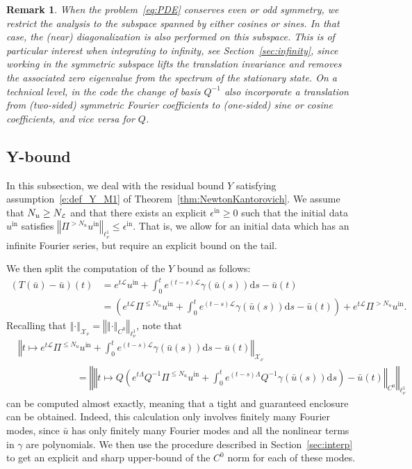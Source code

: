 \documentclass[10pt,a4paper]{article}
\theoremstyle{plain}
\newtheorem{remark}[theorem]{Remark}
\renewcommand{\L}{\mathcal{L}}
\newcommand{\X}{\mathcal{X}}
\newcommand{\bu}{\bar{u}}
\newcommand{\1}{\mathbf{1}}
\newcommand{\uin}{{u^{\mathrm{in}}}}
\newcommand{\Nu}{N_{u}}
\newcommand{\NL}{N_{\text{\tiny{$\L$}}}}
\newcommand{\Nin}{\Nu}
\begin{document}
\begin{remark}\label{rem:symmetry}
When the problem~\eqref{eq:PDE} conserves even or odd symmetry, we restrict the analysis to the subspace spanned by either cosines or sines. In that case, the (near) diagonalization is also performed on this subspace. This is of particular interest when integrating to infinity, see Section~\ref{sec:infinity}, since working in the symmetric subspace lifts the translation invariance and removes the associated zero eigenvalue from the spectrum of the stationary state. On a technical level, in the code the change of basis $Q^{-1}$ also incorporate a translation from (two-sided) symmetric Fourier coefficients to (one-sided) sine or cosine coefficients, and vice versa for $Q$.	
\end{remark}


\subsection{Y-bound}
\label{sec:Ybounds}


In this subsection, we deal with the residual bound $Y$ satisfying assumption~\eqref{e:def_Y_M1} of Theorem~\ref{thm:NewtonKantorovich}. We assume that $\Nin \geq \NL$ and that there exists an explicit $\epsilon^{\mathrm{in}}\geq 0$ such that the initial data $\uin$ satisfies $\left\Vert \Pi^{>\Nin}\uin \right\Vert_{\ell^1_\nu} \leq \epsilon^{\mathrm{in}}$. That is, we allow for an initial data which has an infinite Fourier series, but require an explicit bound on the tail. 

We then split the computation of the $Y$ bound as follows:
\begin{align*}
\left(T(\bu)-\bu\right)(t) &= e^{ t \L} \uin +  \int_{0}^{t} e^{(t-s)\L } 
		\gamma(\bu(s)) \mbox{d} s - \bu \left( t \right) \\
&= \left(e^{ t \L} \Pi^{\leq \Nin}\uin +  \int_{0}^{t} e^{(t-s)\L } 
		\gamma(\bu(s)) \mbox{d} s - \bu \left( t \right)\right) +  e^{ t \L} \Pi^{> \Nin}\uin.
\end{align*}
Recalling that $\left\Vert \cdot \right\Vert_{\X_\nu} = \left\Vert \left\Vert \cdot \right\Vert_{C^0} \right\Vert_{\ell^1_\nu}$, note that 
\begin{align*}
&\left\Vert t\mapsto e^{ t \L} \Pi^{\leq \Nin}\uin +  \int_{0}^{t} e^{(t-s)\L } 
		\gamma(\bu(s)) \mbox{d} s - \bu \left( t \right) \right\Vert_{\X_\nu}  \\
		&\qquad\qquad\qquad= \left\Vert \left\Vert t\mapsto Q\left(e^{ t \Lambda} Q^{-1}\Pi^{\leq \Nin}\uin +  \int_{0}^{t} e^{(t-s)\Lambda } 
		Q^{-1}\gamma(\bu(s)) \mbox{d} s \right) - \bu \left( t \right) \right\Vert_{C^0} \right\Vert_{\ell^1_\nu}
\end{align*}
can be computed almost exactly, meaning that a tight and guaranteed enclosure can be obtained. Indeed, this calculation only involves finitely many Fourier modes, since $\bu$ has only finitely many Fourier modes and all the nonlinear terms in $\gamma$ are polynomials. We then use the procedure described in Section~\ref{sec:interp} to get an explicit and sharp upper-bound of the $C^0$ norm for each of these modes.
\end{document}
